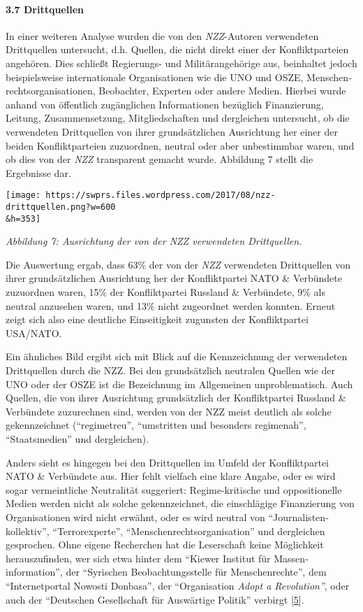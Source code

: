 \hypertarget{37-drittquellen}{%
\paragraph{3.7 Drittquellen}\label{37-drittquellen}}

In einer weiteren Analyse wurden die von den \emph{NZZ}-Autoren
verwendeten Drittquellen untersucht, d.h. Quellen, die nicht direkt
einer der Konfliktparteien angehören. Dies schließt Regierungs- und
Militär­angehörige aus, beinhaltet jedoch beispielsweise internationale
Organisationen wie die UNO und OSZE, Menschen­rechts­organisationen,
Beobachter, Experten oder andere Medien. Hierbei wurde anhand von
öffentlich zugänglichen Informationen bezüglich Finanzierung, Leitung,
Zusammen­setzung, Mitgliedschaften und dergleichen untersucht, ob die
verwendeten Drittquellen von ihrer grundsätzlichen Ausrichtung her einer
der beiden Konflikt­parteien zuzuordnen, neutral oder aber unbestimmbar
waren, und ob dies von der \emph{NZZ} transparent gemacht wurde.
Abbildung 7 stellt die Ergebnisse dar.

\texttt{[image: https://swprs.files.wordpress.com/2017/08/nzz-drittquellen.png?w=600\\\&h=353]}

\emph{Abbildung 7: Ausrichtung der von der NZZ verwendeten
Drittquellen.}

Die Auswertung ergab, dass 63\% der von der \emph{NZZ} verwendeten
Drittquellen von ihrer grundsätzlichen Ausrichtung her der
Konfliktpartei NATO \& Verbündete zuzuordnen waren, 15\% der
Konfliktpartei Russland \& Verbündete, 9\% als neutral anzusehen waren,
und 13\% nicht zugeordnet werden konnten. Erneut zeigt sich also eine
deutliche Einseitigkeit zugunsten der Konfliktpartei USA/NATO.

Ein ähnliches Bild ergibt sich mit Blick auf die Kennzeichnung der
verwendeten Drittquellen durch die NZZ. Bei den grundsätzlich neutralen
Quellen wie der UNO oder der OSZE ist die Bezeichnung im Allgemeinen
unproblematisch. Auch Quellen, die von ihrer Ausrichtung grundsätzlich
der Konfliktpartei Russland \& Verbündete zuzurechnen sind, werden von
der NZZ meist deutlich als solche gekennzeichnet (``regimetreu'',
``umstritten und besonders regimenah'', ``Staatsmedien'' und
dergleichen).

Anders sieht es hingegen bei den Drittquellen im Umfeld der
Konfliktpartei NATO \& Verbündete aus. Hier fehlt vielfach eine klare
Angabe, oder es wird sogar vermeintliche Neutralität suggeriert:
Regime-kritische und oppositionelle Medien werden nicht als solche
gekennzeichnet, die einschlägige Finanzierung von Organisationen wird
nicht erwähnt, oder es wird neutral von ``Journalisten­kollektiv'',
``Terror­experte'', ``Menschen­rechts­organisation'' und dergleichen
gesprochen. Ohne eigene Recherchen hat die Leserschaft keine Möglichkeit
herauszufinden, wer sich etwa hinter dem ``Kiewer Institut für
Massen­information'', der ``Syrischen Beobachtungs­stelle für
Menschen­rechte'', dem ``Internetportal Nowosti Donbasa'', der
``Organisation \emph{Adopt a Revolution''}, oder auch der ``Deutschen
Gesellschaft für Auswärtige Politik'' verbirgt
{[}\protect\hyperlink{anm5}{5}{]}.

